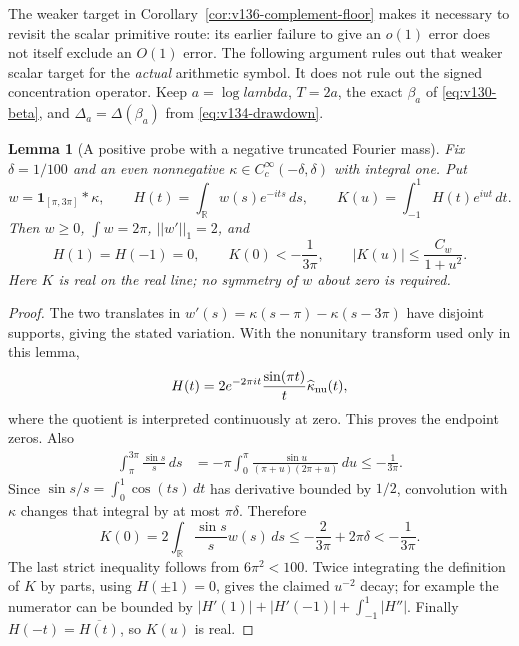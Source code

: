 \documentclass[11pt]{article}
\def\lambda{lambda}%
\def\norm#1{||#1||}%
\newtheorem{lemma}[theorem]{Lemma}
\theoremstyle{remark}
\newcommand{\norm}[1]{\left\lVert #1\right\rVert}
\begin{document}
The weaker target in Corollary~\ref{cor:v136-complement-floor} makes it
necessary to revisit the scalar primitive route: its earlier failure to
give an $o(1)$ error does not itself exclude an $O(1)$ error. The following
argument rules out that weaker scalar target for the \emph{actual}
arithmetic symbol. It does not rule out the signed concentration operator.
Keep $a=\log\lambda$, $T=2a$, the exact $\beta_a$ of
\eqref{eq:v130-beta}, and $\Delta_a=\Delta(\beta_a)$ from
\eqref{eq:v134-drawdown}.

\begin{lemma}[A positive probe with a negative truncated Fourier mass]
\label{lem:v137-probe}
Fix $\delta=1/100$ and an even nonnegative
$\kappa\in C_c^\infty(-\delta,\delta)$ with integral one. Put
\[
 w=\mathbf1_{[\pi,3\pi]}*\kappa,\qquad
 H(t)=\int_{\mathbb R}w(s)e^{-its}\,ds,\qquad
 K(u)=\int_{-1}^1H(t)e^{iut}\,dt.
\]
Then $w\ge0$, $\int w=2\pi$, $\norm{w'}_1=2$, and
\begin{equation}\label{eq:v137-probe-properties}
 H(1)=H(-1)=0,\qquad
 K(0)<-\frac1{3\pi},\qquad
 |K(u)|\le\frac{C_w}{1+u^2}.
\end{equation}
Here $K$ is real on the real line; no symmetry of $w$ about zero is
required.
\end{lemma}
\begin{proof}
The two translates in $w'(s)=\kappa(s-\pi)-\kappa(s-3\pi)$ have
disjoint supports, giving the stated variation. With the nonunitary
transform used only in this lemma,
\[
 H(t)=2e^{-2\pi it}\frac{\sin(\pi t)}{t}\widehat\kappa_{\rm nu}(t),
\]
where the quotient is interpreted continuously at zero. This proves
the endpoint zeros. Also
\begin{align*}
 \int_\pi^{3\pi}\frac{\sin s}{s}\,ds
 &=-\pi\int_0^\pi
       \frac{\sin u}{(\pi+u)(2\pi+u)}\,du
 \le-\frac1{3\pi}.
\end{align*}
Since $\sin s/s=\int_0^1\cos(ts)\,dt$ has derivative bounded by
$1/2$, convolution with $\kappa$ changes that integral by at most
$\pi\delta$. Therefore
\[
 K(0)=2\int_{\mathbb R}\frac{\sin s}{s}w(s)\,ds
 \le-\frac2{3\pi}+2\pi\delta<-\frac1{3\pi}.
\]
The last strict inequality follows from $6\pi^2<100$.
Twice integrating the definition of $K$ by parts, using $H(\pm1)=0$,
gives the claimed $u^{-2}$ decay; for example the numerator can be
bounded by $|H'(1)|+|H'(-1)|+\int_{-1}^1|H''|$.
Finally $H(-t)=\overline{H(t)}$, so $K(u)$ is real.
\end{proof}
\end{document}
